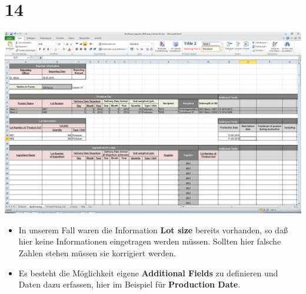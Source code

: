 \documentclass{beamer}
\begin{document}
\section{14}
\begin{frame}
	\begin{center}
  		\includegraphics[height=0.6\textheight]{14.png}
	\end{center}
	\begin{itemize}
		\item In unserem Fall waren die Information \textbf{Lot size} bereits vorhanden, so daß hier keine Informationen eingetragen werden müssen. Sollten hier falsche Zahlen stehen müssen sie korrigiert werden.
		\item Es besteht die Möglichkeit eigene \textbf{Additional Fields} zu definieren und Daten dazu erfassen, hier im Beispiel für \textbf{Production Date}.
	\end{itemize}
\end{frame}
\end{document}
